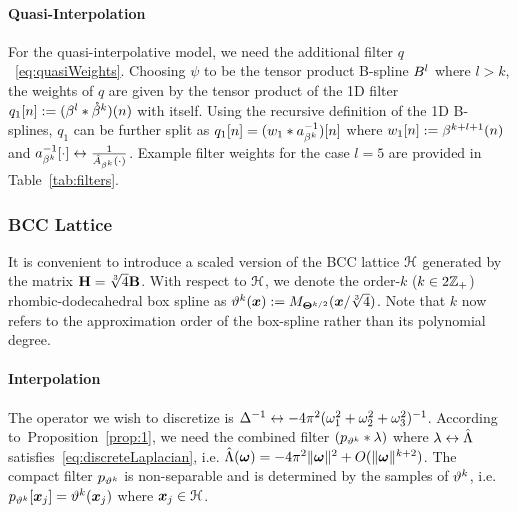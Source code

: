 \paragraph{Quasi-Interpolation}
For the quasi-interpolative model, we need the additional filter
$q$~\eqref{eq:quasiWeights}. Choosing $\psi$ to be the tensor product
B-spline $\tpbs^l$ where $l>k$, the weights of $q$ are given by the
tensor product of the 1D filter $q_1[n] := (\cbs^l \ast
\dual{\cbs}^k)(n)$ with itself. Using the recursive definition
of the 1D B-splines, $q_1$ can be further split as $q_1[n]
= (w_1 \ast a_{\cbs^k}^{-1})[n]$ where $w_1[n] := \cbs^{k+l+1}(n)$ and
$\ftpairs{a_{\cbs^k}^{-1}[\cdot]}{\tfrac{1}{\ft{A}_{\cbs^k}(\cdot)}}$. Example
filter weights for the case $l=5$ are provided in Table~\ref{tab:filters}.

\subsubsection{BCC Lattice}
It is convenient to introduce a scaled version of the BCC lattice
$\lattice{H}$ generated by the matrix $\mat{H} =
\sqrt[3]{4}\mat{B}$. With respect to $\lattice{H}$, we denote the
order-$k$ ($k \in 2\ints_+$) rhombic-dodecahedral box spline as
$\bccbs{k}(\vect{x}) :=
\boxsp[k/2]{\mat{\Theta}}(\vect{x}/\sqrt[3]{4})$. Note that $k$ now
refers to the approximation order of the box-spline rather than its
polynomial degree.

\paragraph{Interpolation}
The operator we wish to discretize is
$\ftpairs{\invlaplacian}{-4\pi^2(\omega_1^2 + \omega_2^2 + \omega_3^2)^{-1}}$.
According to~Proposition~\ref{prop:1}, we need the combined filter
$(p_{\bccbs{k}} \ast \lambda)$ where $\ftpairs{\lambda}{\ft{\Lambda}}$
satisfies~\eqref{eq:discreteLaplacian}, i.e. $\ft{\Lambda}(\vect{\omega}) =
-4\pi^2\norm{\vect{\omega}}^2 + O(\norm{\vect{\omega}}^{k+2})$. The compact
filter $p_{\bccbs{k}}$ is non-separable and is determined by the samples of
$\bccbs{k}$, i.e.
$p_{\bccbs{k}}[\vect{x}_j] = \bccbs{k}(\vect{x}_j)$ where $\vect{x}_j \in
\lattice{H}$. 

